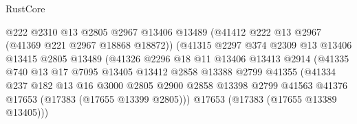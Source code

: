 \begin{lexlean}{RustCore}
\begin{coremodule}
                                      @222
                                      @2310
                                      @13
                                      @2805
                                      @2967
                                      @13406
                                      @13489
                                      (@41412 @222 @13 @2967 (@41369 @221 @2967 @18868 @18872))
                                      (@41315
                                        @2297
                                        @374
                                        @2309
                                        @13
                                        @13406
                                        @13415
                                        @2805
                                        @13489
                                        (@41326
                                          @2296
                                          @18
                                          @11
                                          @13406
                                          @13413
                                          @2914
                                          (@41335
                                            @740
                                            @13
                                            @17
                                            @7095
                                            @13405
                                            @13412
                                            @2858
                                            @13388
                                            @2799
                                            @41355
                                            (@41334
                                              @237
                                              @182
                                              @13
                                              @16
                                              @3000
                                              @2805
                                              @2900
                                              @2858
                                              @13398
                                              @2799
                                              @41563
                                              @41376
                                              @17653
                                              (@17383 (@17655 @13399 @2805)))
                                            @17653
                                            (@17383 (@17655 @13389 @13405)))

\end{coremodule}
\end{lexlean}
